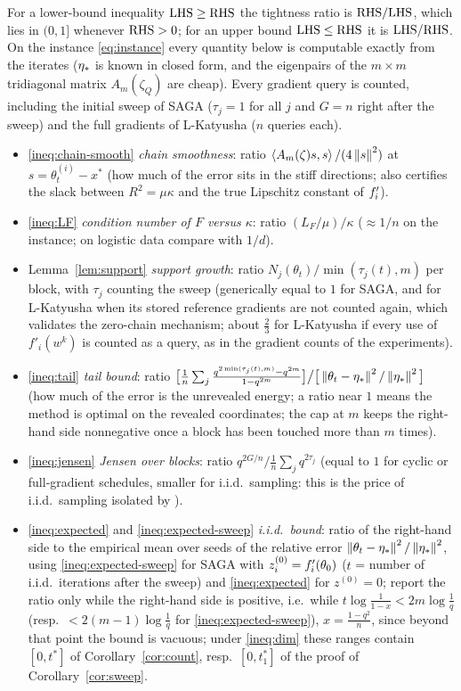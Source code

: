 For a lower-bound inequality ${\rm LHS}\ge{\rm RHS}$ the tightness ratio is ${\rm RHS}/{\rm LHS}$, which lies in $(0,1]$ whenever ${\rm RHS}>0$; for an upper bound ${\rm LHS}\le{\rm RHS}$ it is ${\rm LHS}/{\rm RHS}$. On the instance \eqref{eq:instance} every quantity below is computable exactly from the iterates ($\eta_\ast$ is known in closed form, and the eigenpairs of the $m\times m$ tridiagonal matrix $A_m(\zeta_Q)$ are cheap). Every gradient query is counted, including the initial sweep of SAGA ($\tau_j=1$ for all $j$ and $G=n$ right after the sweep) and the full gradients of L-Katyusha ($n$ queries each).
\begin{itemize}[nosep]
\item \eqref{ineq:chain-smooth} \emph{chain smoothness}: ratio $\left\langle A_m(\zeta)s, s \right\rangle/(4\left\|s\right\|^2)$ at $s=\theta_t^{(i)}-x^\ast$ (how much of the error sits in the stiff directions; also certifies the slack between $R^2=\mu\kappa$ and the true Lipschitz constant of $f'_i$).
\item \eqref{ineq:LF} \emph{condition number of $F$ versus $\kappa$}: ratio $(L_F/\mu)/\kappa$ ($\approx1/n$ on the instance; on logistic data compare with $1/d$).
\item Lemma~\ref{lem:support} \emph{support growth}: ratio $N_j(\theta_t)/\min(\tau_j(t),m)$ per block, with $\tau_j$ counting the sweep (generically equal to $1$ for SAGA, and for L-Katyusha when its stored reference gradients are not counted again, which validates the zero-chain mechanism; about $\frac23$ for L-Katyusha if every use of $f'_i(w^k)$ is counted as a query, as in the gradient counts of the experiments).
\item \eqref{ineq:tail} \emph{tail bound}: ratio $\big[\frac1n\sum_j\frac{q^{2\min(\tau_j(t),m)}-q^{2m}}{1-q^{2m}}\big]\big/\big[\left\|\theta_t-\eta_\ast\right\|^2/\left\|\eta_\ast\right\|^2\big]$ (how much of the error is the unrevealed energy; a ratio near $1$ means the method is optimal on the revealed coordinates; the cap at $m$ keeps the right-hand side nonnegative once a block has been touched more than $m$ times).
\item \eqref{ineq:jensen} \emph{Jensen over blocks}: ratio $q^{2G/n}/\frac1n\sum_jq^{2\tau_j}$ (equal to $1$ for cyclic or full-gradient schedules, smaller for i.i.d.\ sampling: this is the price of i.i.d.\ sampling isolated by \cite{hannah2018breaking}).
\item \eqref{ineq:expected} and \eqref{ineq:expected-sweep} \emph{i.i.d.\ bound}: ratio of the right-hand side to the empirical mean over seeds of the relative error $\left\|\theta_t-\eta_\ast\right\|^2/\left\|\eta_\ast\right\|^2$, using \eqref{ineq:expected-sweep} for SAGA with $z_i^{(0)}=f'_i(\theta_0)$ ($t$ = number of i.i.d.\ iterations after the sweep) and \eqref{ineq:expected} for $z^{(0)}=0$; report the ratio only while the right-hand side is positive, i.e.\ while $t\log\frac1{1-x}<2m\log\frac1q$ (resp.\ $<2(m-1)\log\frac1q$ for \eqref{ineq:expected-sweep}), $x=\frac{1-q^2}n$, since beyond that point the bound is vacuous; under \eqref{ineq:dim} these ranges contain $[0,t^\ast]$ of Corollary~\ref{cor:count}, resp.\ $[0,t_1^\ast]$ of the proof of Corollary~\ref{cor:sweep}.

\end{itemize}
